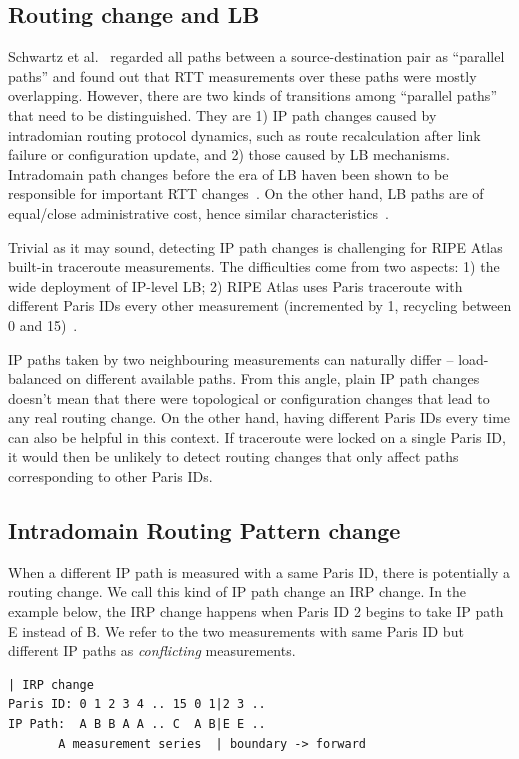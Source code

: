 \subsection{Routing change and \acf{LB}}

Schwartz et al.~\cite{Schwartz2010} regarded all paths between a source-destination pair as ``parallel paths'' and found out that RTT measurements over these paths were mostly overlapping.
However, there are two kinds of transitions among ``parallel paths'' that need to be distinguished.
They are 1) IP path changes caused by intradomian routing protocol dynamics, such as route recalculation after link failure or configuration update, 
and 2) those caused by LB mechanisms. 
Intradomain path changes before the era of LB haven been shown to be responsible for important RTT changes~\cite{Pucha2007}. 
On the other hand, LB paths are of equal/close administrative cost, hence similar characteristics~\cite{Augustin2011}.
 
Trivial as it may sound, detecting IP path changes is challenging for RIPE Atlas built-in traceroute measurements.
The difficulties come from two aspects: 1) the wide deployment of IP-level LB; 2) RIPE Atlas uses Paris traceroute with different Paris IDs every other measurement (incremented by 1, recycling between 0 and 15)~\cite{Augustin2006, Pelsser2013}.

IP paths taken by two neighbouring measurements can naturally differ -- 
load-balanced on different available paths.  
From this angle, plain IP path changes doesn't mean that there were topological or configuration changes that lead to any real routing change. 
On the other hand, having different Paris IDs every time can also be helpful in this context.  If traceroute were locked on a single Paris ID, it would then be unlikely to detect routing changes that only affect paths corresponding to other Paris IDs.

\subsection{Intradomain Routing Pattern change}
When a different IP path is measured with a same Paris ID,
there is potentially a routing change. 
We call this kind of IP path change an \acf{IRP} change.
In the example below, the IRP change happens when Paris ID 2 begins to take IP path E instead of B. We refer to the two measurements with same Paris ID but different IP paths as \textit{conflicting} measurements.
\begin{Verbatim}[fontsize=\small]
                             | IRP change
Paris ID: 0 1 2 3 4 .. 15 0 1|2 3 ..
IP Path:  A B B A A .. C  A B|E E ..
       A measurement series  | boundary -> forward
\end{Verbatim}

